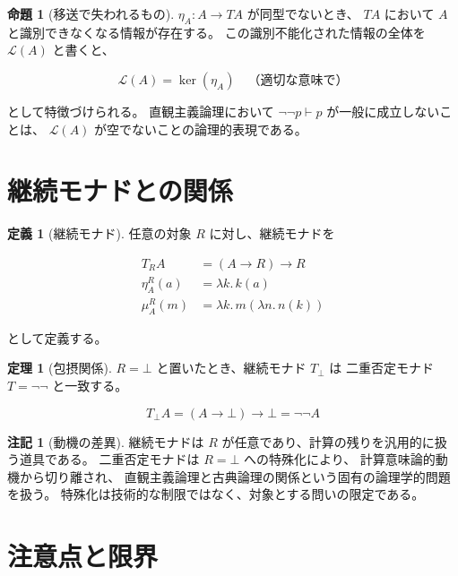 \documentclass[11pt,a4paper]{article}
\theoremstyle{definition}
\newtheorem{definition}{定義}[section]
\newtheorem{theorem}{定理}[section]
\newtheorem{proposition}{命題}[section]
\newtheorem{remark}{注記}[section]
\begin{document}
\begin{proposition}[移送で失われるもの]
$\eta_A: A \to TA$ が同型でないとき、
$TA$ において $A$ と識別できなくなる情報が存在する。
この識別不能化された情報の全体を $\mathcal{L}(A)$ と書くと、

\[
\mathcal{L}(A) = \ker(\eta_A) \quad \text{（適切な意味で）}
\]

として特徴づけられる。
直観主義論理において $\neg\neg p \vdash p$ が一般に成立しないことは、
$\mathcal{L}(A)$ が空でないことの論理的表現である。
\end{proposition}

\section{継続モナドとの関係}

\begin{definition}[継続モナド]
任意の対象 $R$ に対し、継続モナドを

\begin{align}
T_R A &= (A \to R) \to R \\
\eta^R_A(a) &= \lambda k.\, k(a) \\
\mu^R_A(m) &= \lambda k.\, m(\lambda n.\, n(k))
\end{align}

として定義する。
\end{definition}

\begin{theorem}[包摂関係]
$R = \bot$ と置いたとき、継続モナド $T_\bot$ は
二重否定モナド $T = \neg\neg$ と一致する。

\[
T_\bot A = (A \to \bot) \to \bot = \neg\neg A
\]
\end{theorem}

\begin{remark}[動機の差異]
継続モナドは $R$ が任意であり、計算の残りを汎用的に扱う道具である。
二重否定モナドは $R = \bot$ への特殊化により、
計算意味論的動機から切り離され、
直観主義論理と古典論理の関係という固有の論理学的問題を扱う。
特殊化は技術的な制限ではなく、対象とする問いの限定である。
\end{remark}

\section{注意点と限界}
\end{document}
